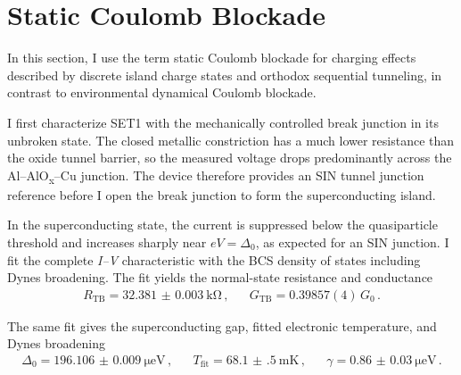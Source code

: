     \section{Static Coulomb Blockade}
    \label{sec:ssn-set:static}

        In this section, I use the term static Coulomb blockade for charging effects described by discrete island charge states and orthodox sequential tunneling, in contrast to environmental dynamical Coulomb blockade.


        I first characterize SET1 with the mechanically controlled break junction in its unbroken state. The closed metallic constriction has a much lower resistance than the oxide tunnel barrier, so the measured voltage drops predominantly across the Al--AlO\textsubscript{x}--Cu junction. The device therefore provides an SIN tunnel junction reference before I open the break junction to form the superconducting island.

        In the superconducting state, the current is suppressed below the quasiparticle threshold and increases sharply near $eV=\Delta_0$, as expected for an SIN junction. I fit the complete \textit{I--V} characteristic with the BCS density of states including Dynes broadening. The fit yields the normal-state resistance and conductance
        \begin{align}
            R_\mathrm{TB} = \qty{32.381(3)}{\kilo\ohm}\,, &&
            G_\mathrm{TB} = 0.39857(4)\,G_0\,.
            \label{eq:ssn-set:static:sin-normal}
        \end{align}

        The same fit gives the superconducting gap, fitted electronic temperature, and Dynes broadening
        \begin{align}
            \Delta_0 = \qty{196.106(9)}{\micro\electronvolt}\,, &&
            T_\mathrm{fit} = \qty{68.1(5)}{\milli\kelvin}\,, &&
            \gamma = \qty{0.86(3)}{\micro\electronvolt}\,.
            \label{eq:ssn-set:static:sin-superconducting}
        \end{align}

